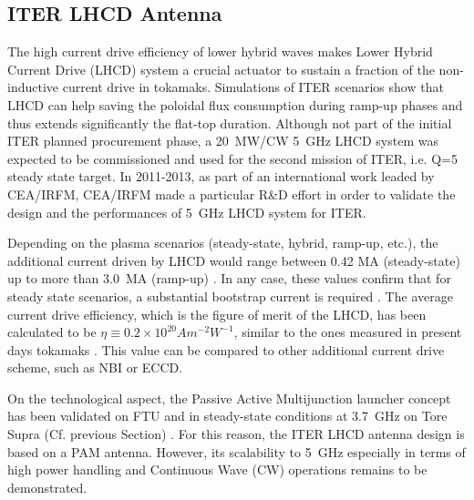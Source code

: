 {%
\subsection{ITER LHCD Antenna}\label{sec:ITER_LHCD_antenna}
The high current drive efficiency of lower hybrid waves makes Lower Hybrid Current Drive (LHCD) system a crucial actuator to sustain a fraction of the non-inductive current drive in tokamaks. Simulations of ITER scenarios show that LHCD can help saving the poloidal flux consumption during ramp-up phases and thus extends significantly the flat-top duration. Although not part of the initial ITER planned procurement phase, a 20~MW/CW 5~GHz LHCD system was expected to be commissioned and used for the second mission of ITER, i.e. Q=5 steady state target. In 2011-2013, as part of an international work leaded by CEA/IRFM, CEA/IRFM made a particular R\&D effort in order to validate the design and the performances of 5~\si{GHz} LHCD system for ITER. 

Depending on the plasma scenarios (steady-state, hybrid, ramp-up, etc.), the additional current driven by LHCD would range between 0.42 MA (steady-state) up to more than 3.0~MA (ramp-up) . In any case, these values confirm that for steady state scenarios, a substantial bootstrap current is required . The average current drive efficiency, which is the figure of merit of the LHCD, has been calculated to be $\eta \equiv 0.2 \times 10^{20} \si{A m^{-2} W^{-1}}$, similar to the ones measured in present days tokamaks . This value  can be compared to other additional current drive scheme, such as NBI or ECCD. 

On the technological aspect, the Passive Active Multijunction launcher concept has been validated on FTU and in steady-state conditions at 3.7~\si{GHz} on Tore Supra (Cf. previous Section) . For this reason, the ITER LHCD antenna design is based on a PAM antenna. However, its scalability to 5~\si{GHz} especially in terms of high power handling and Continuous Wave (CW) operations remains to be demonstrated. 

}
